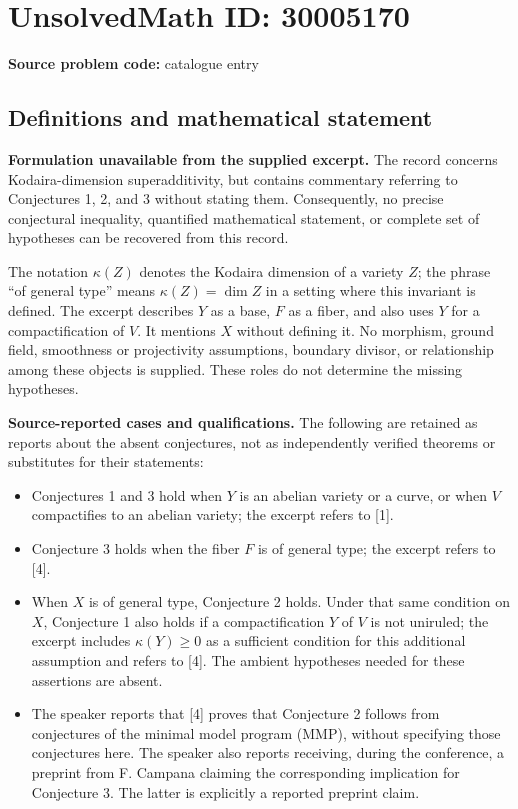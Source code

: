 \documentclass[11pt]{article}
\begin{document}
\section*{UnsolvedMath ID: 30005170}
\textbf{Source problem code:} catalogue entry
\subsection{Definitions and mathematical statement}
\textbf{Formulation unavailable from the supplied excerpt.} The record concerns Kodaira-dimension superadditivity, but contains commentary referring to Conjectures 1, 2, and 3 without stating them. Consequently, no precise conjectural inequality, quantified mathematical statement, or complete set of hypotheses can be recovered from this record.

The notation \(\kappa(Z)\) denotes the Kodaira dimension of a variety \(Z\); the phrase ``of general type'' means \(\kappa(Z)=\dim Z\) in a setting where this invariant is defined. The excerpt describes \(Y\) as a base, \(F\) as a fiber, and also uses \(Y\) for a compactification of \(V\). It mentions \(X\) without defining it. No morphism, ground field, smoothness or projectivity assumptions, boundary divisor, or relationship among these objects is supplied. These roles do not determine the missing hypotheses.

\textbf{Source-reported cases and qualifications.} The following are retained as reports about the absent conjectures, not as independently verified theorems or substitutes for their statements:
\begin{itemize}
\item Conjectures 1 and 3 hold when \(Y\) is an abelian variety or a curve, or when \(V\) compactifies to an abelian variety; the excerpt refers to [1].
\item Conjecture 3 holds when the fiber \(F\) is of general type; the excerpt refers to [4].
\item When \(X\) is of general type, Conjecture 2 holds. Under that same condition on \(X\), Conjecture 1 also holds if a compactification \(Y\) of \(V\) is not uniruled; the excerpt includes \(\kappa(Y)\geq 0\) as a sufficient condition for this additional assumption and refers to [4]. The ambient hypotheses needed for these assertions are absent.
\item The speaker reports that [4] proves that Conjecture 2 follows from conjectures of the minimal model program (MMP), without specifying those conjectures here. The speaker also reports receiving, during the conference, a preprint from F. Campana claiming the corresponding implication for Conjecture 3. The latter is explicitly a reported preprint claim.
\end{itemize}
\end{document}
